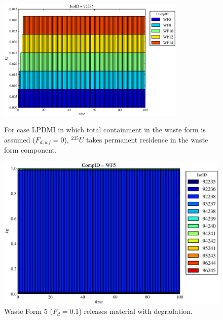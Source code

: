 \begin{figure}[ht]
\centering
\includegraphics[width=0.8\textwidth]{./chapters/demonstration/base/lpDMI.eps}
\caption[$^{235}U$ residence. Lumped Parameter  DM Waste Form No Release.]{
For case LPDMI  in which total containment in the waste form is assumed 
($F_{d,wf}=0$), $^{235}U$ 
takes permanent residence in the waste form  component.
}
\label{fig:lpDMIall}
\begin{minipage}[b]{0.45\linewidth}

  \includegraphics[width=\textwidth]{./chapters/demonstration/base/lpDMI1.eps}
  \caption[LPDMI Waste Form Contaminants.]{
    Waste Form 5 ($F_d = 0.1$) releases material with degradation. 
    }
  \label{fig:lpDMIwf5}
  

\end{minipage}
\end{figure}
